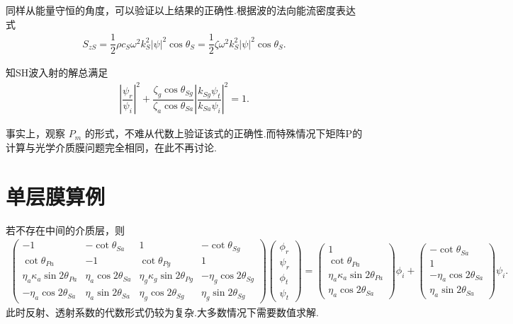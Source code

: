 同样从能量守恒的角度，可以验证以上结果的正确性.根据波的法向能流密度表达式
\begin{align*}
	S_{zS} = \dfrac{1}{2} \rho c_S \omega^2 k_S^2 |\psi|^2 \cos\theta_S = \dfrac{1}{2} \zeta \omega^2 k_S^2 |\psi|^2 \cos\theta_S.
\end{align*}

知SH波入射的解总满足
\begin{align*}
	\left| \dfrac{\psi_r}{\psi_i} \right|^2 + \dfrac{\zeta_g \cos\theta_{Sg}}{\zeta_a \cos\theta_{Sa}} \left| \dfrac{k_{Sg} \psi_t}{k_{Sa} \psi_i} \right|^2 = 1.
\end{align*}

事实上，观察 \(P_m\) 的形式，不难从代数上验证该式的正确性.而特殊情况下矩阵P的计算与光学介质膜问题完全相同，在此不再讨论.

\section{单层膜算例}
若不存在中间的介质层，则
\begin{align*}
	\left( \begin{array}{cccc}
		-1                               & -\cot\theta_{Sa}        & 1                                & -\cot\theta_{Sg}         \\
		\cot\theta_{Pa}                  & -1                      & \cot\theta_{Pg}                  & 1                        \\
		\eta_a \kappa_a \sin2\theta_{Pa} & \eta_a \cos2\theta_{Sa} & \eta_g \kappa_g \sin2\theta_{Pg} & -\eta_g \cos2\theta_{Sg} \\
		-\eta_a \cos2\theta_{Sa}         & \eta_a \sin2\theta_{Sa} & \eta_g \cos2\theta_{Sg}          & \eta_g \sin2\theta_{Sg}
	\end{array} \right) \begin{pmatrix} \phi_r \\ \psi_r \\ \phi_t \\ \psi_t \end{pmatrix} =
	\begin{pmatrix} 1 \\ \cot\theta_{Pa} \\ \eta_a \kappa_a \sin2\theta_{Pa} \\ \eta_a \cos2\theta_{Sa} \end{pmatrix} \phi_i +
	\begin{pmatrix} -\cot\theta_{Sa} \\ 1 \\ -\eta_a \cos2\theta_{Sa} \\ \eta_a \sin2\theta_{Sa} \end{pmatrix} \psi_i.
\end{align*}
此时反射、透射系数的代数形式仍较为复杂.大多数情况下需要数值求解.

